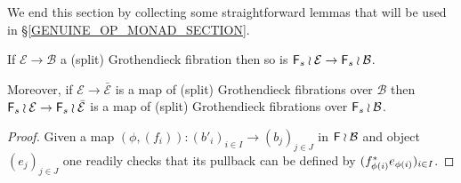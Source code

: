 \documentclass[a4paper,10pt]{article}%
\begin{document}
We end this section by collecting some straightforward lemmas
that will be used in \S \ref{GENUINE_OP_MONAD_SECTION}.

\begin{lemma}\label{FWRGROTH LEM}
	If $\mathcal{E} \to \mathcal{B}$ a (split) Grothendieck fibration then so is 
	$\mathsf{F}_s \wr \mathcal{E} \to \mathsf{F}_s \wr \mathcal{B}$.

	Moreover, if 
	$\mathcal{E} \to \bar{\mathcal{E}}$ is a map of (split) Grothendieck fibrations over $\mathcal{B}$ then
	$\mathsf{F}_s \wr \mathcal{E} \to \mathsf{F}_s \wr \bar{\mathcal{E}}$ is a map of (split) Grothendieck fibrations over $\mathsf{F}_s \wr \mathcal{B}$.
\end{lemma}

\begin{proof}
Given a map 
$(\phi,(f_i)) \colon
(b'_i)_{i \in I} \to (b_j)_{j \in J}$ 
in $\mathsf{F} \wr \mathcal{B}$
and object $(e_j)_{j \in J}$ one readily checks that its pullback can be defined by $(f^{\**}_{\phi(i)}e_{\phi(i)})_{i \in I}$.
\end{proof}
\end{document}
